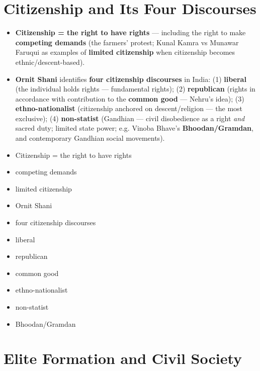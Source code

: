 \section{Citizenship and Its Four Discourses}

\begin{KeyConcept}
\begin{itemize}
\item \textbf{Citizenship = the right to have rights} --- including the right to make \textbf{competing demands} (the farmers' protest; Kunal Kamra vs Munawar Faruqui as examples of \textbf{limited citizenship} when citizenship becomes ethnic/descent-based).
\item \textbf{Ornit Shani} identifies \textbf{four citizenship discourses} in India: (1) \textbf{liberal} (the individual holds rights --- fundamental rights); (2) \textbf{republican} (rights in accordance with contribution to the \textbf{common good} --- Nehru's idea); (3) \textbf{ethno-nationalist} (citizenship anchored on descent/religion --- the most exclusive); (4) \textbf{non-statist} (Gandhian --- civil disobedience as a right \emph{and} sacred duty; limited state power; e.g. Vinoba Bhave's \textbf{Bhoodan/Gramdan}, and contemporary Gandhian social movements).
\end{itemize}
\end{KeyConcept}

\begin{QuickRevision}
\begin{itemize}
\item Citizenship = the right to have rights
\item competing demands
\item limited citizenship
\item Ornit Shani
\item four citizenship discourses
\item liberal
\item republican
\item common good
\item ethno-nationalist
\item non-statist
\item Bhoodan/Gramdan
\end{itemize}
\end{QuickRevision}

\section{Elite Formation and Civil Society}

